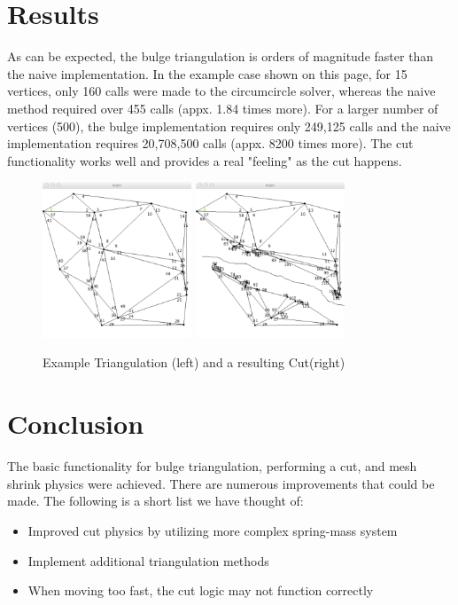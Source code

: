 \documentclass[letterpaper,10pt]{IEEEtran}
\begin{document}
\section{Results}
As can be expected, the bulge triangulation is orders of magnitude faster than the naive implementation.  In the example case shown on this page, for 15 vertices, only 160 calls were made to the circumcircle solver, whereas the naive method required over 455 calls (appx. 1.84 times more).  For a larger number of vertices (500), the bulge implementation requires only 249,125 calls and the naive implementation requires 20,708,500 calls (appx. 8200 times more).  
The cut functionality works well and provides a real "feeling" as the cut happens. 
\begin{figure}[!t]
\centering
\includegraphics[width=1.75in]{main/data/triangulation}
\includegraphics[width=1.75in]{main/data/cut}
\caption{Example Triangulation (left) and a resulting Cut(right)}
\label{fig_triangulation}
\end{figure}

 \section{Conclusion}
 The basic functionality for bulge triangulation, performing a cut, and mesh shrink physics were achieved. 
There are numerous improvements that could be made.  The following is a short list we have thought of:
 \begin{multicols}{2}
\begin{itemize}
\setlength\multicolsep{0pt}
\itemsep0em
\item Improved cut physics by utilizing more complex spring-mass system
\item Implement additional triangulation methods
\item When moving too fast, the cut logic may not function correctly
\end{itemize}
\end{multicols}





%
\end{document}
